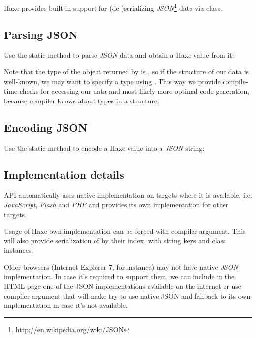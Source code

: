\documentclass{haxe}
\begin{document}
Haxe provides built-in support for (de-)serializing \emph{JSON}\footnote{http://en.wikipedia.org/wiki/JSON} data via  class.

\subsection{Parsing JSON}
\label{std-Json-parsing}

Use the  static method to parse \emph{JSON} data and obtain a Haxe value from it:

Note that the type of the object returned by  is , so if the structure of our data is well-known, we may want to specify a type using . This way we provide compile-time checks for accessing our data and most likely more optimal code generation, because compiler knows about types in a structure:

\subsection{Encoding JSON}
\label{std-Json-encoding}

Use the  static method to encode a Haxe value into a \emph{JSON} string:

\subsection{Implementation details}
\label{std-Json-implementation-details}

 API automatically uses native implementation on targets where it is available, i.e. \emph{JavaScript}, \emph{Flash} and \emph{PHP} and provides its own implementation for other targets.

Usage of Haxe own implementation can be forced with  compiler argument. This will also provide serialization of  by their index,  with string keys and class instances.

Older browsers (Internet Explorer 7, for instance) may not have native \emph{JSON} implementation. In case it's required to support them, we can include in the HTML page one of the JSON implementations available on the internet or use  compiler argument that will make  try to use native JSON and fallback to its own implementation in case it's not available.
\end{document}
